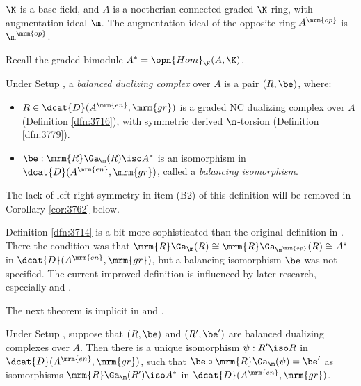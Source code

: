 \begin{setup} \label{setup:3925}
$\K$ is a base field, and $A$ is a noetherian connected graded 
$\K$-ring, with augmentation ideal $\m$. 
The augmentation ideal of the opposite ring $A^{\mrm{op}}$ is 
$\m^{\mrm{op}}$. 
\end{setup}

Recall the graded bimodule $A^* = \opn{Hom}_{\K}(A, \K)$. 

\begin{dfn}[\cite{Ye1}] \label{dfn:3714} 
Under Setup \tup{\ref{setup:3925}}, a {\em balanced dualizing complex} 
over $A$ is a pair $(R, \be)$, where:
\begin{itemize}
\item[(B1)] $R \in \dcat{D}(A^{\mrm{en}}, \mrm{gr})$ is a graded NC 
dualizing 
complex over $A$ (Definition \ref{dfn:3716}), with symmetric derived 
$\m$-torsion (Definition \ref{dfn:3779}). 

\item[(B2)] $\be : \mrm{R} \Ga_{\m}(R) \iso A^*$
is an isomorphism in $\dcat{D}(A^{\mrm{en}}, \mrm{gr})$, called a 
{\em balancing isomorphism}.
\end{itemize}
\end{dfn}

The lack of left-right symmetry in item (B2) of this 
definition will be removed in Corollary \ref{cor:3762} below. 

\begin{rem} \label{rem:4030}
Definition \ref{dfn:3714} is a bit more sophisticated than the 
original definition in \cite{Ye1}. There the condition was that 
$\mrm{R} \Ga_{\m}(R) \cong \mrm{R} \Ga_{\m^{\mrm{op}}}(R) \cong A^*$
in $\dcat{D}(A^{\mrm{en}}, \mrm{gr})$, but a balancing isomorphism 
$\be$ was not specified. The current improved definition is influenced by later 
research, especially \cite{YeZh1} and \cite{VyYe}.
\end{rem}

The next theorem is implicit in \cite{Ye1} and \cite{YeZh1}. 

\begin{thm} \label{thm:3710}
Under Setup \tup{\ref{setup:3925}}, suppose that $(R, \be)$ and $(R', \be')$ 
are balanced dualizing complexes over $A$. 
Then there is a unique isomorphism 
$\psi : R' \iso R$
in $\dcat{D}(A^{\mrm{en}}, \mrm{gr})$, 
such that 
$\be \circ \mrm{R} \Ga_{\m}(\psi) = \be'$
as isomorphisms 
$\mrm{R} \Ga_{\m}(R') \iso A^*$
in $\dcat{D}(A^{\mrm{en}}, \mrm{gr})$.
\end{thm}

